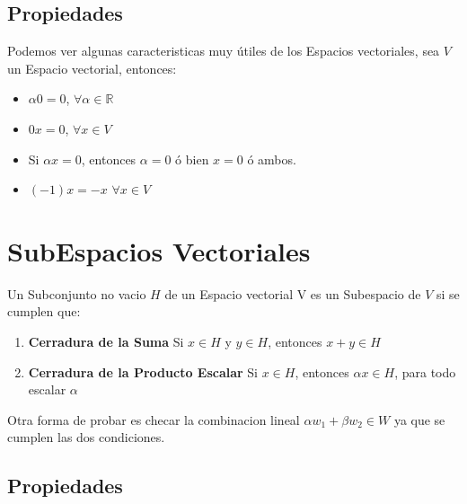 \documentclass[12pt]{report}							    %
\begin{document}
        \subsection{Propiedades}
        Podemos ver algunas caracteristicas muy útiles de los Espacios vectoriales, sea $V$ 
        un Espacio vectorial, entonces:
        \begin{itemize}
            \item $\alpha 0 = 0 $, $\forall \alpha \in \mathbb{R}$\\
            \item $0x = 0$, $\forall x \in V$
            \item Si $\alpha x = 0$, entonces $\alpha = 0$ ó bien $x = 0$ ó ambos.
            \item $(-1)x = -x$ $\forall x \in V$
        \end{itemize}


    \clearpage
    \section{SubEspacios Vectoriales}    
    
        Un Subconjunto no vacio $H$ de un Espacio vectorial V
        es un Subespacio de $V$ si se cumplen que:

        \begin{enumerate}
            \item \textbf{Cerradura de la Suma}
            Si $x \in H$ y $y \in H$, entonces $x + y \in H$

            \item \textbf{Cerradura de la Producto Escalar}
            Si $x \in H$, entonces $\alpha x \in H$, para
            todo escalar $\alpha$
        \end{enumerate}

        Otra forma de probar es checar la combinacion lineal $\alpha w_1 + \beta w_2 \in W$
        ya que se cumplen las dos condiciones.

        \subsection{Propiedades}
\end{document}
